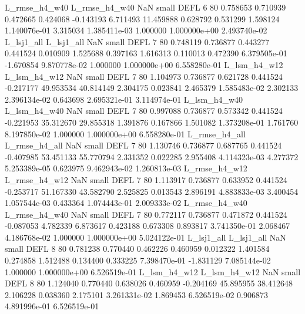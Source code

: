 L_rmse_h4_w40 L_rmse_h4_w40                   NaN      small     DEFL                 6 80 0.758653       0.710939 0.472665       0.424068   -0.143193      6.711493     11.459888     0.628792       0.531299  1.598124 1.140076e-01     3.315034   1.385411e-03            1.000000    1.000000e+00        2.493740e-02
   L_lsj1_all    L_lsj1_all                   NaN      small     DEFL                 7 80 0.748119       0.736877 0.443277       0.441524    0.010909      1.525688      0.397163     1.616313       0.110013  0.472390 6.379505e-01    -1.670854   9.870778e-02            1.000000    1.000000e+00        6.558280e-01
 L_lsm_h4_w12  L_lsm_h4_w12                   NaN      small     DEFL                 7 80 1.104973       0.736877 0.621728       0.441524   -0.217177     49.953534     40.814149     2.304175       0.023841  2.465379 1.585483e-02     2.302133   2.396134e-02            0.643698    2.695321e-01        3.114974e-01
 L_lsm_h4_w40  L_lsm_h4_w40                   NaN      small     DEFL                 7 80 0.997088       0.736877 0.573342       0.441524   -0.221953     35.312670     29.855318     1.391876       0.167866  1.501082 1.373208e-01     1.761760   8.197850e-02            1.000000    1.000000e+00        6.558280e-01
L_rmse_h4_all L_rmse_h4_all                   NaN      small     DEFL                 7 80 1.130746       0.736877 0.687765       0.441524   -0.407985     53.451133     55.770794     2.331352       0.022285  2.955408 4.114323e-03     4.277372   5.253389e-05            0.623975    9.462943e-02        1.260813e-03
L_rmse_h4_w12 L_rmse_h4_w12                   NaN      small     DEFL                 7 80 1.113917       0.736877 0.633952       0.441524   -0.253717     51.167330     43.582790     2.525825       0.013543  2.896191 4.883833e-03     3.400454   1.057544e-03            0.433364    1.074443e-01        2.009333e-02
L_rmse_h4_w40 L_rmse_h4_w40                   NaN      small     DEFL                 7 80 0.772117       0.736877 0.471872       0.441524   -0.087053      4.782339      6.873617     0.423188       0.673308  0.893817 3.741350e-01     2.068467   4.186768e-02            1.000000    1.000000e+00        5.024122e-01
   L_lsj1_all    L_lsj1_all                   NaN      small     DEFL                 8 80 0.781238       0.770440 0.462226       0.460959    0.012322      1.401584      0.274858     1.512488       0.134400  0.333225 7.398470e-01    -1.831129   7.085144e-02            1.000000    1.000000e+00        6.526519e-01
 L_lsm_h4_w12  L_lsm_h4_w12                   NaN      small     DEFL                 8 80 1.124040       0.770440 0.638026       0.460959   -0.204169     45.895955     38.412648     2.106228       0.038360  2.175101 3.261331e-02     1.869453   6.526519e-02            0.906873    4.891996e-01        6.526519e-01
